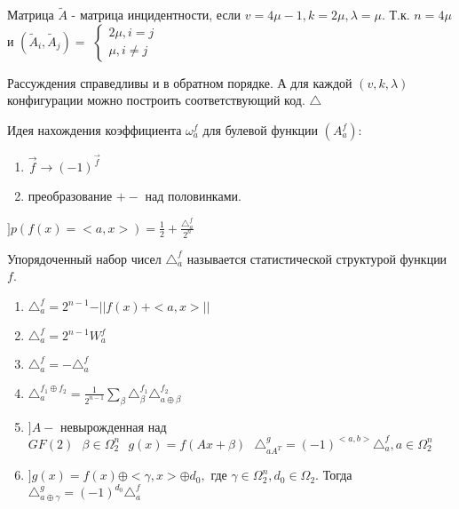 Матрица $\tilde{A}$ - матрица инцидентности, если $v = 4\mu - 1, k = 2\mu, \lambda = \mu$.
Т.к. $n = 4\mu$ и $(\tilde{A}_i, \tilde{A}_j) = $
$\begin{cases}
	2\mu, i = j \\
	\mu, i\neq j
\end{cases}$

Рассуждения справедливы и в обратном порядке. А для каждой $(v, k, \lambda)$ конфигурации
можно построить соответствующий код. $\triangle $

Идея нахождения коэффициента $\omega_a^f$ для булевой функции $(A_a^f)$:
\begin{enumerate}
	\item $\overrightarrow{f} \rightarrow (-1)^{\overrightarrow{f}}$
	\item преобразование $+-$ над половинками.
\end{enumerate}

$] p(f(x) = <a, x>) = \frac{1}{2} + \frac{\triangle_a^f}{2^n}$

\opr
Упорядоченный набор чисел $\triangle_a^f$ называется статистической структурой функции $f$.

\utv
\begin{enumerate}
	\item $\triangle_a^f = 2^{n - 1} - \vert\vert f(x) + <a, x> \vert\vert$
	\item $\triangle_a^f = 2^{n - 1} W_a^f$
	\item $\triangle_a^f = -\triangle_a^f$
	\item $\triangle_a^{f_1 \oplus f_2} = \frac{1}{2^{n - 1}} \sum_{\beta}\triangle_{\beta}^{f_1}\triangle_{a \oplus \beta}^{f_2}$
	\item $] A -$ невырожденная над $GF(2) \text{ } \beta \in \Omega_2^n \text{ } g(x) = f(Ax + \beta) \text{ } \triangle_{aA^T}^g = (-1)^{<a,b>}\triangle_a^f, a \in \Omega_2^n$
	\item $] g(x) = f(x) \oplus <\gamma, x> \oplus d_0, $ где $\gamma \in \Omega_2^n, d_0 \in \Omega_2$.
	Тогда $\triangle_{a\oplus\gamma}^g = (-1)^{d_0}\triangle_a^f$
\end{enumerate}